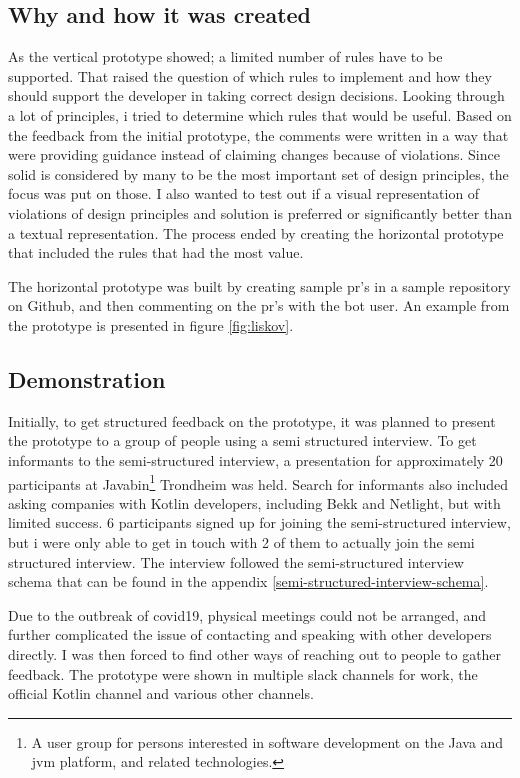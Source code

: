 \documentclass{report}
\begin{document}
\subsection*{Why and how it was created}
As the vertical prototype showed; a limited number of rules have to be supported. That raised the question of which rules to implement and how they should support the developer in taking correct design decisions. Looking through a lot of principles, i tried to determine which rules that would be useful. Based on the feedback from the initial prototype, the comments were written in a way that were providing guidance instead of claiming changes because of violations. Since \gls{solid} is considered by many to be the most important set of design principles, the focus was put on those. I also wanted to test out if a visual representation of violations of design principles and solution is preferred or significantly better than a textual representation. The process ended by creating the horizontal prototype that included the rules that had the most value. 


The horizontal prototype was built by creating sample \gls{pr}'s in a sample repository on Github\cite{sample-repository}, and then commenting on the \gls{pr}'s with the bot user. An example from the prototype is presented in figure \ref{fig:liskov}.

\subsection*{Demonstration}
Initially, to get structured feedback on the prototype, it was planned to present the prototype to a group of people using a semi structured interview. To get informants to the semi-structured interview, a presentation for approximately 20 participants at Javabin\footnote{A user group for persons interested in software development on the Java and \gls{jvm} platform, and related technologies.} Trondheim was held. Search for informants also included asking companies with Kotlin developers, including Bekk and Netlight, but with limited success. 6 participants signed up for joining the semi-structured interview, but i were only able to get in touch with 2 of them to actually join the semi structured interview. The interview followed the semi-structured interview schema that can be found in the appendix \ref{semi-structured-interview-schema}.

Due to the outbreak of \gls{covid19}, physical meetings could not be arranged, and further complicated the issue of contacting and speaking with other developers directly. I was then forced to find other ways of reaching out to people to gather feedback. The prototype were shown in multiple slack channels for work, the official Kotlin channel and various other channels.
\end{document}

